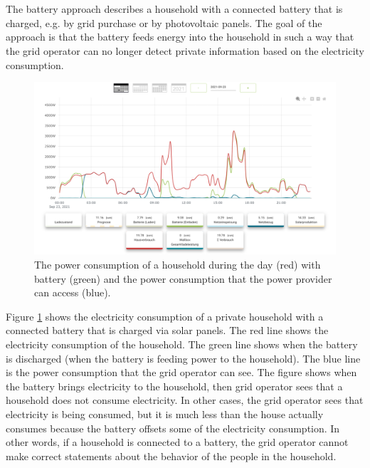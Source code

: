 \\
\\
The battery approach describes a household with a connected battery that is charged, e.g. by grid purchase or by photovoltaic panels. The goal of the approach is that the battery feeds energy into the household in such a way that the grid operator can no longer detect private information based on the electricity consumption. \\
\begin{figure}[tbp]
  \centering
  \includegraphics[width=1\textwidth]{images/Battery4.png}
  \caption[Battery Consumption Figure]{The power consumption of a household during the day (red) with battery (green) and the power consumption that the power provider can access (blue).}
  \label{fig:Battery}
\end{figure}
Figure \ref{fig:Battery} shows the electricity consumption of a private household with a connected battery that is charged via solar panels. The red line shows the electricity consumption of the household. The green line shows when the battery is discharged (when the battery is feeding power to the household). The blue line is the power consumption that the grid operator can see. The figure shows when the battery brings electricity to the household, then grid operator sees that a household does not consume electricity. In other cases, the grid operator sees that electricity is being consumed, but it is much less than the house actually consumes because the battery offsets some of the electricity consumption. In other words, if a household is connected to a battery, the grid operator cannot make correct statements about the behavior of the people in the household. \\

